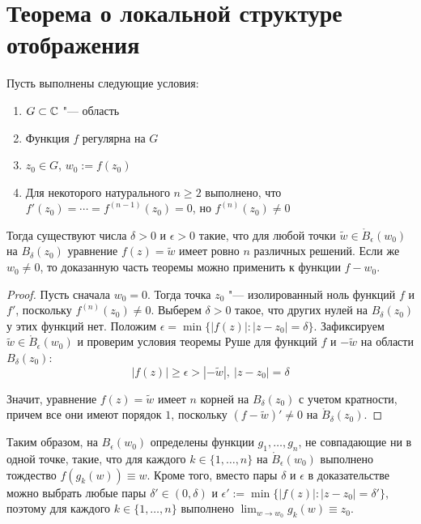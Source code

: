 \section{Теорема о локальной структуре отображения}

\begin{theorem}
	Пусть выполнены следующие условия:
	\begin{enumerate}
		\item $G \subset \mathbb{C}$ "--- область
		\item Функция $f$ регулярна на $G$
		\item $z_0 \in G$, $w_0 := f(z_0)$
		\item Для некоторого натурального $n \ge 2$ выполнено, что $f'(z_0) = \dotsb = f^{(n - 1)}(z_0) = 0$, но $f^{(n)}(z_0) \ne 0$
	\end{enumerate}
	
	Тогда существуют числа $\delta > 0$ и $\epsilon > 0$ такие, что для любой точки $\widetilde w \in \mathring B_\epsilon(w_0)$ на $B_\delta(z_0)$ уравнение $f(z) = \widetilde w$ имеет ровно $n$ различных решений. Если же $w_0 \ne 0$, то доказанную часть теоремы можно применить к функции $f - w_0$.
\end{theorem}

\begin{proof}
	Пусть сначала $w_0 = 0$. Тогда точка $z_0$ "--- изолированный ноль функций $f$ и $f'$, поскольку $f^{(n)}(z_0) \ne 0$. Выберем $\delta > 0$ такое, что других нулей на $B_\delta(z_0)$ у этих функций нет. Положим $\epsilon = \min\{|f(z)| : |z - z_0| = \delta\}$. Зафиксируем $\widetilde w \in \mathring B_\epsilon(w_0)$ и проверим условия теоремы Руше для функций $f$ и $-\widetilde{w}$ на области $B_\delta(z_0)$:
	\[|f(z)| \ge \epsilon > |-\widetilde{w}|,~|z - z_0| = \delta\]
	
	Значит, уравнение $f(z) = \widetilde w$ имеет $n$ корней на $B_\delta(z_0)$ с учетом кратности, причем все они имеют порядок $1$, поскольку $(f- \widetilde w)' \ne 0$ на $\mathring B_\delta(z_0)$.
\end{proof}

\begin{note}
	Таким образом, на $B_\epsilon(w_0)$ определены функции $g_1, \dotsc, g_n$, не совпадающие ни в одной точке, такие, что для каждого $k \in \{1, \dotsc, n\}$ на $\mathring B_\epsilon(w_0)$ выполнено тождество $f(g_k(w)) \equiv w$. Кроме того, вместо пары $\delta$ и $\epsilon$ в доказательстве можно выбрать любые пары $\delta' \in (0, \delta)$ и $\epsilon' := \min\{|f(z)| : |z - z_0| = \delta'\}$, поэтому для каждого $k \in \{1, \dotsc, n\}$ выполнено $\lim_{w \to w_0}g_k(w) \equiv z_0$.
\end{note}

